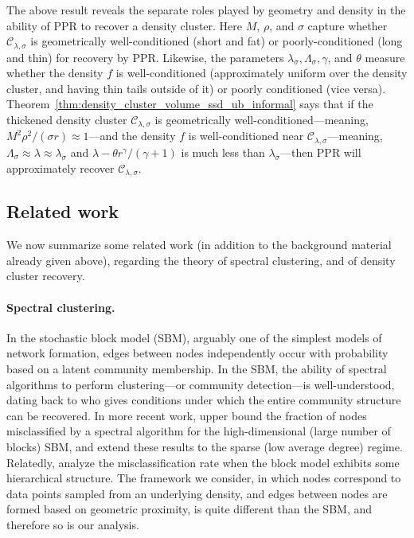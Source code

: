 \documentclass[11pt,twoside]{article}
\newcommand{\1}{\mathbf{1}}
\newcommand{\mc}[1]{\mathcal{#1}}
\begin{document}
The above result reveals the separate roles played by geometry and density in the ability of PPR to recover a density cluster. Here $M$, $\rho$, and $\sigma$ capture whether $\mc{C}_{\lambda,\sigma}$ is geometrically well-conditioned (short and fat) or poorly-conditioned (long and thin) for recovery by PPR. Likewise, the parameters $\lambda_{\sigma}, \Lambda_{\sigma}, \gamma$, and $\theta$ measure whether the density $f$ is well-conditioned (approximately uniform over the density cluster, and having thin tails outside of it) or poorly conditioned (vice versa). Theorem~\ref{thm:density_cluster_volume_ssd_ub_informal} says that if the thickened density cluster $\mc{C}_{\lambda,\sigma}$ is geometrically well-conditioned---meaning, $M^2\rho^2/(\sigma r) \approx 1$---and the density $f$ is well-conditioned near $\mc{C}_{\lambda,\sigma}$---meaning, $\Lambda_{\sigma} \approx \lambda \approx \lambda_{\sigma}$ and $\lambda - \theta r^{\gamma}/(\gamma + 1)$ is much less than $\lambda_{\sigma}$---then PPR will approximately recover $\mc{C}_{\lambda,\sigma}$.

\subsection{Related work}
\label{subsec:related_work}
We now summarize some related work (in addition to the background material already given above), regarding the theory of spectral clustering, and of density cluster recovery.

\paragraph{Spectral clustering.} In the stochastic block model (SBM), arguably one of the simplest models of network formation, edges between nodes independently occur with probability based on a latent community membership. In the SBM, the ability of spectral algorithms to perform clustering---or community detection---is well-understood, dating back to \citet{mcsherry2001} who gives conditions under which the entire community structure can be recovered. In more recent work, \citet{rohe2011} upper bound the fraction of nodes misclassified by a spectral algorithm for the high-dimensional (large number of blocks) SBM, and \citet{lei2015} extend these results to the sparse (low average degree) regime. Relatedly, \citet{clauset08,balakrishnan2011,li2018} analyze the misclassification rate when the block model exhibits some hierarchical structure. The framework we consider, in which nodes correspond to data points sampled from an underlying density, and edges between nodes are formed based on geometric proximity, is quite different than the SBM, and therefore so is our analysis.
\end{document}

